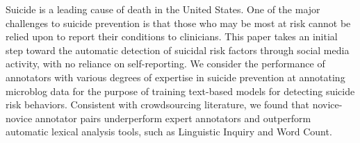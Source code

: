 Suicide is a leading cause of death in the United States. One of the major challenges to suicide prevention is that those who may be most at risk cannot be relied upon to report their conditions to clinicians. This paper takes an initial step toward the automatic detection of suicidal risk factors through social media activity, with no reliance on self-reporting.  We consider the performance of annotators with various degrees of expertise in suicide prevention at annotating microblog data for the purpose of training text-based models for detecting suicide risk behaviors. Consistent with crowdsourcing literature, we found that novice-novice annotator pairs underperform expert annotators and outperform automatic lexical analysis tools, such as Linguistic Inquiry and Word Count.
